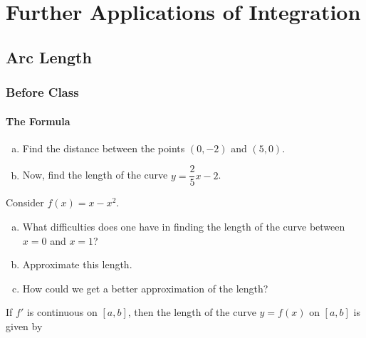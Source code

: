 \documentclass[notes]{subfiles}
\begin{document}
	\chapter{Further Applications of Integration}
	\fancyhead[LO,RE]{\bfseries \small \currentname}
	\fancyfoot[C]{{}}
	\fancyfoot[RO,LE]{\large \thepage}	%
	
\section*{Arc Length}\label{cs81}
	\subsection*{Before Class}
	\subsubsection*{The Formula}
		\begin{ex}
			\begin{enumerate}[(a)]
				\item Find the distance between the points $(0,-2)$ and $(5,0)$.
					
				\item Now, find the length of the curve $y = \dfrac{2}{5}x - 2$.
			\end{enumerate}
		\end{ex}
		
		\begin{ex}
			Consider $f(x) = x-x^2$.  
			\begin{enumerate}[(a)]
				\item What difficulties does one have in finding the length of the curve between $x = 0$ and $x = 1$?
					\vs{.5}
					
				\item Approximate this length.
					\vs{1}
				
				\item How could we get a better approximation of the length?
					\vs{1}
			\end{enumerate}
		\end{ex}
			\newpage
			
		\begin{rmk}
			If $f'$ is continuous on $[a,b]$, then the length of the curve $y = f(x)$ on $[a,b]$ is given by\\[30pt]
		\end{rmk}
		\begin{pf}
			$ $
		\end{pf}
			\newpage
			
\end{document}
